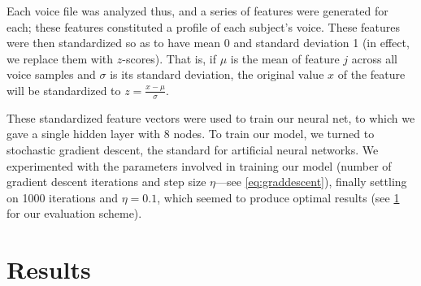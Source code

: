 \documentclass[10pt]{article}
\begin{document}
Each voice file was analyzed thus, and a series of features were generated for each; these features constituted a profile of each subject's voice.
These features were then standardized so as to have mean 0 and standard deviation 1 (in effect, we replace them with $z$-scores).
That is, if $\mu$ is the mean of feature $j$ across all voice samples and $\sigma$ is its standard deviation, the original value $x$ of the feature will be standardized to $z = \frac{x - \mu}{\sigma}$.

These standardized feature vectors were used to train our neural net, to which we gave a single hidden layer with 8 nodes.
To train our model, we turned to stochastic gradient descent, the standard for artificial neural networks.
We experimented with the parameters involved in training our model (number of gradient descent iterations and step size $\eta$---see \cref{eq:graddescent}), finally settling on 1000 iterations and $\eta = 0.1$, which seemed to produce optimal results (see \cref{sec:results} for our evaluation scheme).




\section{Results}
\label{sec:results}

\end{document}
